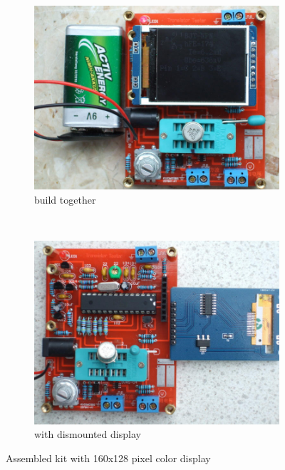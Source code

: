 \begin{figure}[H]
  \begin{subfigure}[b]{.5\textwidth}
    \centering
    \includegraphics[width=1.\textwidth]{../PNG/Kit_Color_a.jpg}
    \caption{build together}
  \end{subfigure}
  ~
  \begin{subfigure}[b]{.5\textwidth}
    \centering
    \includegraphics[width=1.\textwidth]{../PNG/Kit_Color_b.jpg}
    \caption{with dismounted display}
  \end{subfigure}
  \caption{Assembled kit with 160x128 pixel color display}
  \label{fig:Kit_color}
\end{figure}

